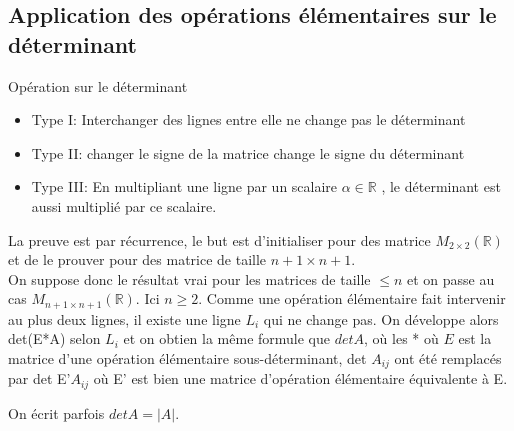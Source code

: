 
\subsection{Application des opérations élémentaires sur le déterminant}
\begin{parag}{Opération sur le déterminant}
    
\begin{itemize}
    \item Type I: Interchanger des lignes entre elle ne change pas le déterminant
    \item Type II: changer le signe de la matrice change le signe du déterminant
    \item Type III: En multipliant une ligne par un scalaire $\alpha \in \mathbb{R}$ , le déterminant est aussi multiplié par ce scalaire.

     
\end{itemize}

La preuve est par récurrence, le but est d'initialiser pour des matrice $M_{2\times 2}(\mathbb{R})$ et de le prouver pour des matrice de taille $n+1\times n+1$. 
\\
On suppose donc le résultat vrai pour les matrices de taille $\leq n$ et on passe au cas $M_{n+1\times n+1}(\mathbb{R})$. Ici $n \geq 2$. Comme une opération élémentaire fait intervenir au plus deux lignes, il existe une ligne $L_i$ qui ne change pas. On développe alors det(E*A) selon $L_i$ et on obtien la même formule que $det A$, où les * où $E$ est la matrice d'une opération élémentaire sous-déterminant, det $A_{ij}$ ont été remplacés par det E'$A_{ij}$ où E' est bien une matrice d'opération élémentaire équivalente à E.
\begin{framedremark}
    On écrit parfois $det A = |A|$.
\end{framedremark}
    


\end{parag}
